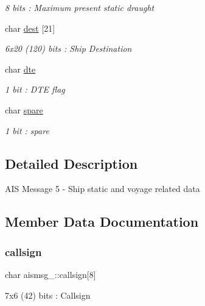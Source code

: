 \begin{DoxyCompactItemize}
\begin{DoxyCompactList}\small\item\em 8 bits \+: Maximum present static draught \end{DoxyCompactList}\item 
char \mbox{\hyperlink{structaismsg__5_a6dca583bfbfa450ae5642c783b3b91f9}{dest}} \mbox{[}21\mbox{]}
\begin{DoxyCompactList}\small\item\em 6x20 (120) bits \+: Ship Destination \end{DoxyCompactList}\item 
char \mbox{\hyperlink{structaismsg__5_af6a74c42fdd03f33226e241e21dcdcb4}{dte}}
\begin{DoxyCompactList}\small\item\em 1 bit \+: D\+TE flag \end{DoxyCompactList}\item 
char \mbox{\hyperlink{structaismsg__5_a1869c39b4f9fe8699776413b02d48cfc}{spare}}
\begin{DoxyCompactList}\small\item\em 1 bit \+: spare \end{DoxyCompactList}\end{DoxyCompactItemize}


\subsection{Detailed Description}
A\+IS Message 5 -\/ Ship static and voyage related data 

\subsection{Member Data Documentation}
\mbox{\label{structaismsg__5_acf513c07ef92b555d4d36283c78b80a7}} 
\subsubsection{\texorpdfstring{callsign}{callsign}}
{\footnotesize\ttfamily char aismsg\+\_\+::callsign\mbox{[}8\mbox{]}}



7x6 (42) bits \+: Callsign 

\mbox{\label{structaismsg__5_a6dca583bfbfa450ae5642c783b3b91f9}} 
